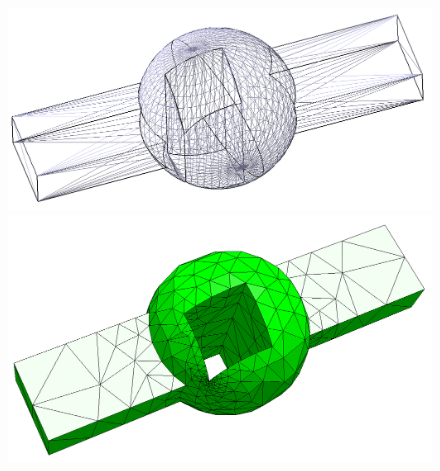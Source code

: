 \begin{figure}[H]
\begin{minipage}[b]{0.495\textwidth}
\includegraphics[width=1.0\textwidth]{pictures/Triangles.png}
\end{minipage}
\hspace{0.01\textwidth}
\begin{minipage}[b]{0.495\textwidth}
\includegraphics[width=1.0\textwidth]{pictures/FEM_rough.png}
\end{minipage}
\caption{}
\label{fig:DiffGeoRepr2}
\end{figure}
